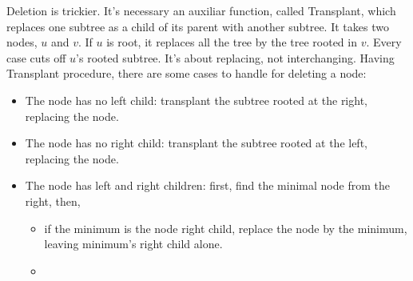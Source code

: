 Deletion is trickier. It's necessary an auxiliar function, called Transplant, which replaces one subtree as a child of its parent with another subtree.
It takes two nodes, $u$ and $v$. If $u$ is root, it replaces all the tree by the tree rooted in $v$.
Every case cuts off $u$'s rooted subtree. It's about replacing, not interchanging.
Having Transplant procedure, there are some cases to handle for deleting a node:
\begin{itemize}
	\item The node has no left child: transplant the subtree rooted at the right, replacing the node.
	\item The node has no right child: transplant the subtree rooted at the left, replacing the node.
	\item The node has left and right children: first, find the minimal node from the right, then,
		\begin{itemize}
			\item if the minimum is the node right child, replace the node by the minimum, leaving minimum's right child alone. 
			\item
		\end{itemize}
\end{itemize}
